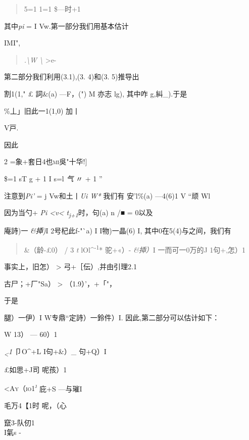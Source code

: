 \begin{quote}
5=1 1=1 \$---时+1
\end{quote}

其中\emph{pi} = I Vw.第一部分我们用基本估计

IMI",

\begin{quote}
\emph{.\textbackslash{}W \textbackslash{}} \textgreater{}e-
\end{quote}

第二部分我们利用(3.1),(3. 4)和(3. 5)推导出

\textbar{}割1(1," £ 詞\&(a) ---F，(")\textbar{} M 亦志 lg)\textbar{},
其中咋 g,糾\_\textbar{}).于是

\%\textbar{}丄」旧此一1(1,0)\textbar{} \textbar{}加丨

V戸.

因此

2 =象+套日4也\textsc{mi}吳"十华!{]}

\$=1 sT g + 1 I s=l \emph{气} 〃 + 1 ''

注意到\emph{Pi'} = j Vw和土丨\emph{Ui W*} 我们有 安'{l\%(a) ---4(6)1} V
``顽 {Wl}

因为当勺+ \emph{Pi \textless{}v\textless{}
t\textsubscript{j+1}}时，句(a) n /■ = 0以及

庵詩)一 \emph{\&揷)}I 2号杞此f-"`a) I I物)一晶(6) I,
其中0在5(4)与之间，我们有

\begin{quote}
\textbar{}\&（龄-£0）\textbar{} / 3 \emph{t}
lOl\^{}\textsuperscript{-1}* 驼+«）- \emph{\&揷）}I
一而可一0万\textbar{}的J 1句+,怎）1
\end{quote}

事实上，旧怎）\textbar{} \textgreater{}
\textbar{}弓+［伝）\textbar{},并由引理2.1

\textbar{}古尸；+厂"Sa）\textbar{} \textgreater{} （1.9）'，+「"，

于是

\textbar{}腿）一伊）I W专鼎``定詩）一鈴件）I.
因此,第二部分可以估计如下：

W {13） --- 60）1}

\emph{\textsubscript{\textless{}}1} 卩O\^{}+L {I句+\&）\_ 句+Q）I}

£如思+J司 呢孩）1

\textsc{\textless{}Ay（io1\textsuperscript{j}} {庇+S ---与璀I}

毛万4【1时 呢，（心

{竄3-队仞1\\
}I氣s -


